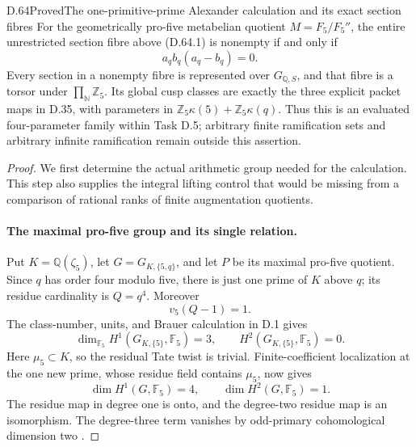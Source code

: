 \begin{statement}{D.64}{Proved}{The one-primitive-prime Alexander calculation and its exact section fibres}
For the geometrically pro-five metabelian quotient
\(M=F_5/F_5''\), the entire unrestricted section fibre
above (D.64.1) is nonempty if and only if
\[
                       a_qb_q(a_q-b_q)=0.
                                                        \tag{D.64.7}
\]
Every section in a nonempty fibre is represented over
\(G_{\mathbb Q,S}\), and that fibre is a torsor under
\(\prod_{\mathbb N}\mathbb Z_5\). Its global cusp classes
are exactly the three explicit packet maps in D.35,
with parameters in
\(\mathbb Z_5\kappa(5)+\mathbb Z_5\kappa(q)\).
Thus this is an evaluated four-parameter family within
Task D.5; arbitrary finite ramification sets and arbitrary
infinite ramification remain outside this assertion.
\end{statement}

\begin{proof}
We first determine the actual arithmetic group needed
for the calculation. This step also supplies the integral
lifting control that would be missing from a comparison
of rational ranks of finite augmentation quotients.

\paragraph{The maximal pro-five group and its single relation.}
Put \(K=\mathbb Q(\zeta_5)\), let \(G=G_{K,\{5,q\}}\),
and let \(P\) be its maximal pro-five quotient. Since
\(q\) has order four modulo five, there is just one prime
of \(K\) above \(q\); its residue cardinality is
\(Q=q^4\). Moreover
\[
                         v_5(Q-1)=1.                  \tag{D.64.8}
\]
The class-number, units, and Brauer calculation in D.1
gives
\[
 \dim_{\mathbb F_5}H^1(G_{K,\{5\}},\mathbb F_5)=3,
 \qquad H^2(G_{K,\{5\}},\mathbb F_5)=0.
\]
Here \(\mu_5\subset K\), so the residual Tate twist is
trivial. Finite-coefficient localization at the one new
prime, whose residue field contains \(\mu_5\), now gives
\[
       \dim H^1(G,\mathbb F_5)=4,
       \qquad \dim H^2(G,\mathbb F_5)=1.               \tag{D.64.9}
\]
The residue map in degree one is onto, and the degree-two
residue map is an isomorphism. The degree-three term
vanishes by odd-primary cohomological dimension two
\cite[I, Theorem 4.10(c); II, Proposition 2.9]{DE_MilneADT}.


\end{proof}
